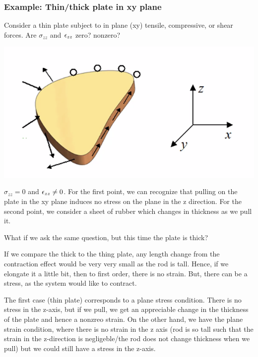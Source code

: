 \documentclass[../PHYS306Notes.tex]{subfiles}
\begin{document}
\subsubsection{Example: Thin/thick plate in xy plane}
Consider a thin plate subject to in plane (xy) tensile, compressive, or shear forces. Are $\sigma_{zz}$ and $\epsilon_{zz}$ zero? nonzero?
\begin{center}
    \includegraphics[scale=0.8]{Lecture-31/l31-img4.png}
\end{center}
\begin{s}
$\sigma_{zz} = 0$ and $\epsilon_{zz} \neq 0$. For the first point, we can recognize that pulling on the plate in the xy plane induces no stress on the plane in the z direction. For the second point, we consider a sheet of rubber which changes in thickness as we pull it.
\end{s}
What if we ask the same question, but this time the plate is thick?
\begin{s}
If we compare the thick to the thing plate, any length change from the contraction effect would be very very small as the rod is tall. Hence, if we elongate it a little bit, then to first order, there is no strain. But, there can be a stress, as the system would like to contract.
\end{s}

The first case (thin plate) corresponds to a plane stress condition. There is no stress in the z-axis, but if we pull, we get an appreciable change in the thickness of the plate and hence a nonzreo strain. On the other hand, we have the plane strain condition, where there is no strain in the z axis (rod is so tall such that the strain in the z-direction is negligeble/the rod does not change thickness when we pull) but we could still have a stress in the z-axis.
\end{document}
